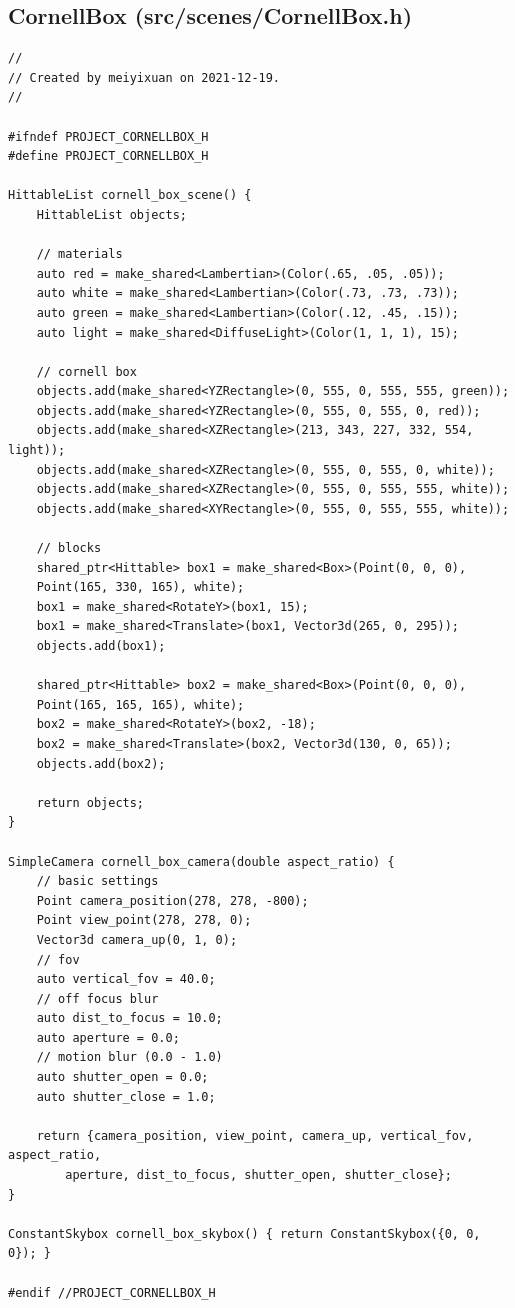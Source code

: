 \documentclass[utf8]{article}
\begin{document}
\subsection{CornellBox (src/scenes/CornellBox.h)}
\begin{lstlisting}[style=CStyle]
//
// Created by meiyixuan on 2021-12-19.
//

#ifndef PROJECT_CORNELLBOX_H
#define PROJECT_CORNELLBOX_H

HittableList cornell_box_scene() {
	HittableList objects;
	
	// materials
	auto red = make_shared<Lambertian>(Color(.65, .05, .05));
	auto white = make_shared<Lambertian>(Color(.73, .73, .73));
	auto green = make_shared<Lambertian>(Color(.12, .45, .15));
	auto light = make_shared<DiffuseLight>(Color(1, 1, 1), 15);
	
	// cornell box
	objects.add(make_shared<YZRectangle>(0, 555, 0, 555, 555, green));
	objects.add(make_shared<YZRectangle>(0, 555, 0, 555, 0, red));
	objects.add(make_shared<XZRectangle>(213, 343, 227, 332, 554, light));
	objects.add(make_shared<XZRectangle>(0, 555, 0, 555, 0, white));
	objects.add(make_shared<XZRectangle>(0, 555, 0, 555, 555, white));
	objects.add(make_shared<XYRectangle>(0, 555, 0, 555, 555, white));
	
	// blocks
	shared_ptr<Hittable> box1 = make_shared<Box>(Point(0, 0, 0),
	Point(165, 330, 165), white);
	box1 = make_shared<RotateY>(box1, 15);
	box1 = make_shared<Translate>(box1, Vector3d(265, 0, 295));
	objects.add(box1);
	
	shared_ptr<Hittable> box2 = make_shared<Box>(Point(0, 0, 0),
	Point(165, 165, 165), white);
	box2 = make_shared<RotateY>(box2, -18);
	box2 = make_shared<Translate>(box2, Vector3d(130, 0, 65));
	objects.add(box2);
	
	return objects;
}

SimpleCamera cornell_box_camera(double aspect_ratio) {
	// basic settings
	Point camera_position(278, 278, -800);
	Point view_point(278, 278, 0);
	Vector3d camera_up(0, 1, 0);
	// fov
	auto vertical_fov = 40.0;
	// off focus blur
	auto dist_to_focus = 10.0;
	auto aperture = 0.0;
	// motion blur (0.0 - 1.0)
	auto shutter_open = 0.0;
	auto shutter_close = 1.0;
	
	return {camera_position, view_point, camera_up, vertical_fov, aspect_ratio,
		aperture, dist_to_focus, shutter_open, shutter_close};
}

ConstantSkybox cornell_box_skybox() { return ConstantSkybox({0, 0, 0}); }

#endif //PROJECT_CORNELLBOX_H

\end{lstlisting}
\end{document}
